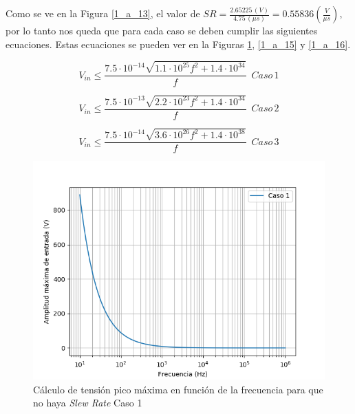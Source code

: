 Como se ve en la Figura \ref{1_a_13}, el valor de $SR=\frac{2.65225\,(V)}{4.75\,(\mu s)}=0.55836\left(\frac{V}{\mu s}\right)$,
por lo tanto nos queda que para cada caso se deben cumplir las siguientes
ecuaciones. Estas ecuaciones se pueden ver en la Figuras \ref{1_a_4},
\ref{1_a_15} y \ref{1_a_16}.

\[
V_{in}\leq\frac{7.5\cdot10^{-14}\sqrt{1.1\cdot10^{25}f^{2}+1.4\cdot10^{34}}}{f}\,\,\,Caso\,1
\]

\[
V_{in}\leq\frac{7.5\cdot10^{-13}\sqrt{2.2\cdot10^{23}f^{2}+1.4\cdot10^{34}}}{f}\,\,\,Caso\,2
\]

\[
V_{in}\leq\frac{7.5\cdot10^{-14}\sqrt{3.6\cdot10^{26}f^{2}+1.4\cdot10^{38}}}{f}\,\,\,Caso\,3
\]

\begin{figure}[H]
\begin{centering}
\includegraphics[scale=0.5]{../Ex1/iA/Resources1a/SlewRate1}
\par\end{centering}
\caption{Cálculo de tensión pico máxima en función de la frecuencia para que
no haya \emph{Slew Rate} Caso 1}
\label{1_a_4}

\end{figure}

